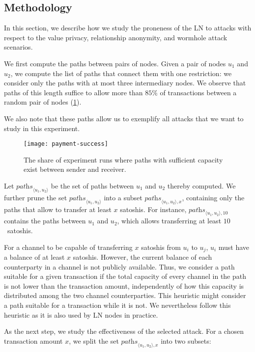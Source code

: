 \subsection{Methodology}
In this section, we describe how we study the proneness of the LN to attacks with respect to the value privacy, relationship anonymity, and wormhole attack scenarios.

We first compute the paths between pairs of nodes.
Given a pair of nodes $u_1$ and $u_2$, we compute the list of paths that connect them with one restriction: we consider only the paths with at most three intermediary nodes.
We observe that paths of this length suffice to allow more than $85\%$ of transactions between a random pair of nodes (\cref{fig:payment-success}).

We also note that these paths allow us to exemplify all attacks that we want to study in this experiment.
\begin{figure}
	\centering
	\texttt{[image: payment-success]}
	\caption{The share of experiment runs where paths with sufficient capacity exist between sender and receiver.}
	\label{fig:payment-success}
\end{figure}

Let $\textit{paths}_{\langle u_1, u_2 \rangle}$ be the set of paths between $u_1$ and $u_2$ thereby computed.
We further prune the set $\textit{paths}_{\langle u_1, u_2 \rangle}$ into a subset $\textit{paths}_{\langle u_1, u_2 \rangle, x}$, containing only the paths that allow to transfer at least $x$ satoshis.
For instance, $\textit{paths}_{\langle u_1, u_2 \rangle, 10}$ contains the paths between $u_1$ and $u_2$, which allows transferring at least $10$~satoshis.

For a channel to be capable of transferring $x$ satoshis from $u_i$ to $u_j$, $u_i$ must have a balance of at least $x$ satoshis.
However, the current balance of each counterparty in a channel is not publicly available.
Thus, we consider a path suitable for a given transaction if the total capacity of every channel in the path is not lower than the transaction amount, independently of how this capacity is distributed among the two channel counterparties.
This heuristic might consider a path suitable for a transaction while it is not.
We nevertheless follow this heuristic as it is also used by LN nodes in practice.

As the next step, we study the effectiveness of the selected attack.
For a chosen transaction amount $x$, we split the set $\textit{paths}_{\langle u_1, u_2 \rangle, x}$ into two subsets:

